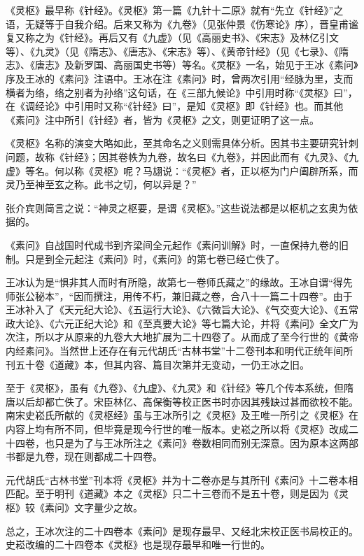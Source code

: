 \documentclass[a4paper,12pt,UTF8,twoside]{ctexbook}
\begin{document}
	《灵枢》最早称《针经》。《灵枢》第一篇《九针十二原》就有“先立《针经》”之语，无疑等于自我介绍。后来又称为《九卷》（见张仲景《伤寒论》序），晋皇甫谧复又称之为《针经》。再后又有《九虚》（见《高丽史书》、《宋志》及林亿引文等）、《九灵》（见《隋志》、《唐志》、《宋志》等）、《黄帝针经》（见《七录》、《隋志》、《唐志》及新罗国、高丽国史书等）等名。《灵枢》一名，始见于王冰《素问》序及王冰的《素问》注语中。王冰在注《素问》时，曾两次引用“经脉为里，支而横者为络，络之别者为孙络”这句话，在《三部九候论》中引用时称“《灵枢》曰”，在《调经论》中引用时又称“《针经》曰”，是知《灵枢》即《针经》也。而其他《素问》注中所引《针经》者，皆为《灵枢》之文，则更证明了这一点。
	
	《灵枢》名称的演变大略如此，至其命名之义则需具体分析。因其书主要研究针刺问题，故称《针经》；因其卷帙为九卷，故名曰《九卷》，并因此而有《九灵》、《九虚》等名。何以称《灵枢》呢？马翃说：“《灵枢》者，正以枢为门户阖辟所系，而灵乃至神至玄之称。此书之切，何以异是？”
	
	张介宾则简言之说：“神灵之枢要，是谓《灵枢》。”这些说法都是以枢机之玄奥为依据的。
	
	《素问》自战国时代成书到齐梁间全元起作《素问训解》时，一直保持九卷的旧制。只是到全元起注《素问》时，《素问》的第七卷已经亡佚了。
	
	王冰认为是“惧非其人而时有所隐，故第七一卷师氏藏之”的缘故。王冰自谓“得先师张公秘本”，“因而撰注，用传不朽，兼旧藏之卷，合八十一篇二十四卷”。由于王冰补入了《天元纪大论》、《五运行大论》、《六微旨大论》、《气交变大论》、《五常政大论》、《六元正纪大论》和《至真要大论》等七篇大论，并将《素问》全文广为次注，所以才从原来的九卷大大地扩展为二十四卷了。从而成了至今行世的《黄帝内经素问》。当然世上还存在有元代胡氏“古林书堂”十二卷刊本和明代正统年间所刊五十卷《道藏》本，但其内容、篇目次第并无变动，一仍王冰之旧。
	
	至于《灵枢》，虽有《九卷》、《九虚》、《九灵》和《针经》等几个传本系统，但隋唐以后却都亡佚了。宋臣林亿、高保衡等校正医书时亦因其残缺过甚而欲校不能。南宋史崧氏所献的《灵枢经》虽与王冰所引之《灵枢》及王唯一所引之《灵枢》在内容上均有所不同，但毕竟是现今行世的唯一版本。史崧之所以将《灵枢》改成二十四卷，也只是为了与王冰所注之《素问》卷数相同而别无深意。因为原本这两部书都是九卷，现在则都成二十四卷。
	
	元代胡氏“古林书堂”刊本将《灵枢》并为十二卷亦是与其所刊《素问》十二卷本相匹配。至于明刊《道藏》本之《灵枢》只二十三卷而不是五十卷，则是因为《灵枢》较《素问》文字量少之故。
	
	总之，王冰次注的二十四卷本《素问》是现存最早、又经北宋校正医书局校正的。史崧改编的二十四卷本《灵枢》也是现存最早和唯一行世的。
	
\end{document}
